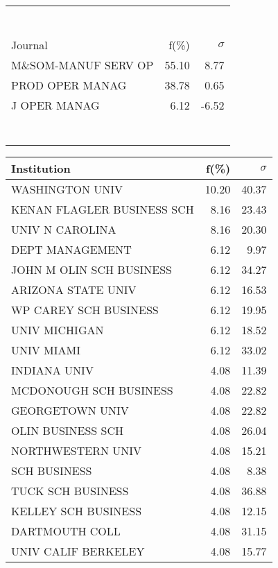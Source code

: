 \documentclass[a4paper,11pt]{report}
\begin{document}
\begin{landscape}
\begin{table}[!ht]
{\begin{tabular}{|l r  r|}
 &  & \\
 &  & \\
 &  & \\
 &  & \\
 &  & \\
 &  & \\
 &  & \\
\hline
\hline
Journal & f(\%) & $\sigma$\\
\hline
M\&SOM-MANUF SERV OP & 55.10 & 8.77\\
PROD OPER MANAG & 38.78 & 0.65\\
J OPER MANAG & 6.12 & -6.52\\
 &  & \\
 &  & \\
 &  & \\
 &  & \\
 &  & \\
 &  & \\
 &  & \\
\hline
\end{tabular}
}
{\scriptsize\begin{tabular}{|l r r|}
\hline
Institution & f(\%) & $\sigma$\\
\hline
WASHINGTON UNIV & 10.20 & 40.37\\
KENAN FLAGLER BUSINESS SCH & 8.16 & 23.43\\
UNIV N CAROLINA & 8.16 & 20.30\\
DEPT MANAGEMENT & 6.12 & 9.97\\
JOHN M OLIN SCH BUSINESS & 6.12 & 34.27\\
ARIZONA STATE UNIV & 6.12 & 16.53\\
WP CAREY SCH BUSINESS & 6.12 & 19.95\\
UNIV MICHIGAN & 6.12 & 18.52\\
UNIV MIAMI & 6.12 & 33.02\\
INDIANA UNIV & 4.08 & 11.39\\
MCDONOUGH SCH BUSINESS & 4.08 & 22.82\\
GEORGETOWN UNIV & 4.08 & 22.82\\
OLIN BUSINESS SCH & 4.08 & 26.04\\
NORTHWESTERN UNIV & 4.08 & 15.21\\
SCH BUSINESS & 4.08 & 8.38\\
TUCK SCH BUSINESS & 4.08 & 36.88\\
KELLEY SCH BUSINESS & 4.08 & 12.15\\
DARTMOUTH COLL & 4.08 & 31.15\\
UNIV CALIF BERKELEY & 4.08 & 15.77\\

\end{tabular}}
\end{table}
\end{landscape}
\end{document}
